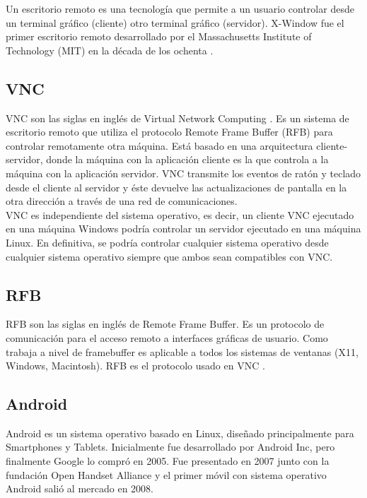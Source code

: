 Un escritorio remoto es una tecnología que permite a un usuario controlar desde un terminal gráfico (cliente) otro terminal gráfico (servidor). X-Window fue el primer escritorio remoto desarrollado por el Massachusetts Institute of Technology (MIT) en la década de los ochenta \cite{wiki:er}.\\

\subsection{VNC}

VNC son las siglas en inglés de Virtual Network Computing \cite{wiki:vnc}. Es un sistema de escritorio remoto que utiliza el protocolo Remote Frame Buffer (RFB) para controlar remotamente otra máquina. Está basado en una arquitectura cliente-servidor, donde la máquina con la aplicación cliente es la que controla a la máquina con la aplicación servidor. VNC transmite los eventos de ratón y teclado desde el cliente al servidor y éste devuelve las actualizaciones de pantalla en la otra dirección a través de una red de comunicaciones.\\

VNC es independiente del sistema operativo, es decir, un cliente VNC ejecutado en una máquina Windows podría controlar un servidor ejecutado en una máquina Linux. En definitiva, se podría controlar cualquier sistema operativo desde cualquier sistema operativo siempre que ambos sean compatibles con VNC.\\

\subsection{RFB}

RFB son las siglas en inglés de Remote Frame Buffer. Es un protocolo de comunicación para el acceso remoto a interfaces gráficas de usuario. Como trabaja a nivel de framebuffer es aplicable a todos los sistemas de ventanas (X11, Windows, Macintosh). RFB es el protocolo usado en VNC \cite{RFB:RFB}.\\

\subsection{Android}

Android es un sistema operativo basado en Linux, diseñado principalmente para Smartphones y Tablets. Inicialmente fue desarrollado por Android Inc, pero finalmente Google lo compró en 2005. Fue presentado en 2007 junto con la fundación Open Handset Alliance y el primer móvil con sistema operativo Android salió al mercado en 2008.\\

